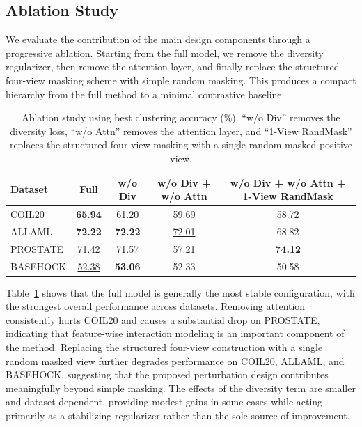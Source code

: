\documentclass[sigconf,natbib=true,anonymous=true]{acmart}
\begin{document}
\subsection{Ablation Study}
We evaluate the contribution of the main design components through a progressive
ablation. Starting from the full model, we remove the diversity regularizer, then
remove the attention layer, and finally replace the structured four-view masking
scheme with simple random masking. This produces a compact hierarchy from the
full method to a minimal contrastive baseline.
\begin{table}[h]
  \caption{Ablation study using best clustering accuracy (\%). ``w/o Div'' removes the diversity loss, ``w/o Attn'' removes the attention layer, and ``1-View RandMask'' replaces the structured four-view masking with a single random-masked positive view.}
  \label{tab:ablation}
  \centering
  \begin{tabular}{lcccc}
    \toprule
    Dataset & Full & w/o Div & w/o Div + w/o Attn & w/o Div + w/o Attn + 1-View RandMask \\
    \midrule
    COIL20   & \textbf{65.94} & \underline{61.20} & 59.69 & 58.72 \\
    ALLAML   & \textbf{72.22} & \textbf{72.22} & \underline{72.01} & 68.82 \\
    PROSTATE & \underline{71.42} & 71.57 & 57.21 & \textbf{74.12} \\
    BASEHOCK & \underline{52.38} & \textbf{53.06} & 52.33 & 50.58 \\
    \bottomrule
  \end{tabular}
\end{table}

Table~\ref{tab:ablation} shows that the full model is generally the most stable
configuration, with the strongest overall performance across datasets. Removing
attention consistently hurts COIL20 and causes a substantial drop on PROSTATE,
indicating that feature-wise interaction modeling is an important component of
the method. Replacing the structured four-view construction with a single random
masked view further degrades performance on COIL20, ALLAML, and BASEHOCK,
suggesting that the proposed perturbation design contributes meaningfully beyond
simple masking. The effects of the diversity term are smaller and dataset
dependent, providing modest gains in some cases while acting primarily as a
stabilizing regularizer rather than the sole source of improvement.
\end{document}
